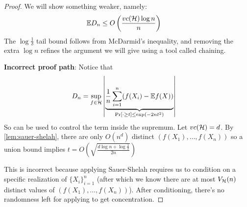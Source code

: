 \begin{proof}
    We will show something weaker, namely:
    \begin{align}
        \mathbb{E} D_n &\leq O\left( \frac{vc(\mathcal{H}) \log n}{n} \right)
    \end{align}
    The $\log \frac{1}{\delta}$ tail bound follows from McDarmid's inequality,
    and removing the extra $\log n$ refines the argument we will give using a tool called chaining.

    \textbf{Incorrect proof path}: Notice that
    \begin{align}
        D_n &= \sup_{f \in \mathcal{H}} \left\lvert
            \underbrace{\frac{1}{n} \sum_{i=1}^n (f(X_i) - \mathbb{E} f(X))}_{\Pr[\cdot \geq t] \leq \exp(-2 n t^2)}
        \right\rvert
    \end{align}
    So  can be used to control the term inside the supremum.
    Let $vc(\mathcal{H}) = d$.
    By \cref{lem:sauer-shelah}, there are only $O(n^d)$ distinct $(f(X_1), \ldots, f(X_n))$
    so a union bound implies $t = O\left(\sqrt{\frac{d \log n + \log \frac{1}{\delta}}{2n}}\right)$

    This is incorrect because applying Sauer-Shelah requires us to condition on a specific realization of $\{X_i\}_{i=1}^n$
    (after which we know there are at most $V_{\mathcal{H}}(n)$ distinct values of $(f(X_1), \ldots, f(X_n))$).
    After conditioning, there's no randomness left for applying  to get concentration.


\end{proof}
